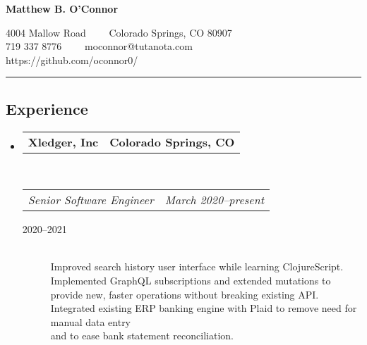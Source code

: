 \documentclass[10pt,letterpaper]{article}
\makeatletter
\newcommand{\headerrow}[2]
{\begin{tabular*}{\linewidth}{l@{\extracolsep{\fill}}r}
  #1 &
  #2 \\
\end{tabular*}}
\makeatother
\begin{document}
\begin{center}
{\LARGE \textbf{Matthew B. O'Connor}}

4004 Mallow Road\ \ \textbullet
\ \ Colorado Springs, CO 80907
\\
719 337 8776\ \ \textbullet
\ \ moconnor@tutanota.com
\\
https://github.com/oconnor0/
\end{center}

\hrule
\vspace{-0.4em}
\subsection*{Experience}

\begin{itemize}
  \parskip=0.1em

  \item
  \headerrow
    {\textbf{Xledger, Inc}}
    {\textbf{Colorado Springs, CO}}
  \\
  \headerrow
    {\emph{Senior Software Engineer}}
    {\emph{March 2020--present}}
  \begin{description}
    \item[2020--2021] \hfill \\
        Improved search history user interface while learning ClojureScript. \\
        Implemented GraphQL subscriptions and extended mutations to provide new, faster operations without breaking existing API. \\
        Integrated existing ERP banking engine with Plaid to remove need for manual data entry \\  and to ease bank statement reconciliation.
  \end{description}


\end{itemize}
\end{document}
